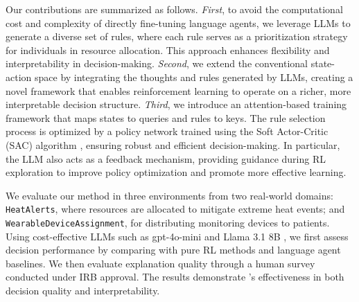 Our contributions are summarized as follows. \textit{First}, to avoid the computational cost and complexity of directly fine-tuning language agents, we leverage LLMs to generate a diverse set of rules, where each rule serves as a prioritization strategy for individuals in resource allocation. This approach enhances flexibility and interpretability in decision-making.
\textit{Second}, we extend the conventional state-action space by integrating the thoughts and rules generated by LLMs, creating a novel framework that enables reinforcement learning to operate on a richer, more interpretable decision structure.
\textit{Third}, we introduce an attention-based training framework that maps states to queries and rules to keys. The rule selection process is optimized by a policy network trained using the Soft Actor-Critic (SAC) algorithm \cite{haarnoja2018soft}, ensuring robust and efficient decision-making. In particular, the LLM also acts as a feedback mechanism, providing guidance during RL exploration to improve policy optimization and promote more effective learning. 
 



We evaluate our method in three environments from two real-world domains: \texttt{HeatAlerts}, where resources are allocated to mitigate extreme heat events; and \texttt{WearableDeviceAssignment}, for distributing monitoring devices to patients. 
Using cost-effective LLMs such as gpt-4o-mini \cite{openai2024gpt4omini} and Llama 3.1 8B \cite{meta2024llama3.1}, we first assess decision performance by comparing \rbrl with pure RL methods and language agent baselines. We then evaluate explanation quality through a human survey conducted under IRB approval. The results demonstrate \rbrl's effectiveness in both decision quality and interpretability.














